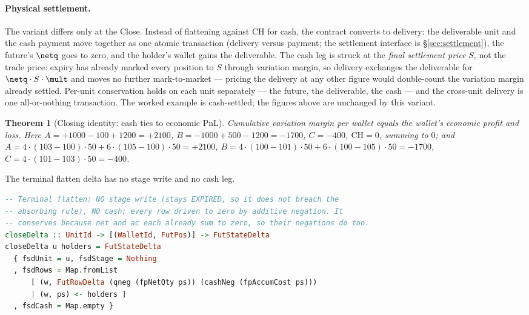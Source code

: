 \documentclass[11pt,a4paper]{article}
\newtheorem{theorem}[definition]{Theorem}
\begin{document}
\paragraph{Physical settlement.} The variant differs only at the Close. Instead of flattening against
CH for cash, the contract converts to delivery: the deliverable unit and the cash payment move
together as one atomic transaction (delivery versus payment; the settlement interface is
\S\ref{sec:settlement}), the future's $\netq$ goes to zero, and the holder's wallet gains the deliverable.
The cash leg is struck at the \emph{final settlement price} $S$, not the trade price: expiry has
already marked every position to $S$ through variation margin, so delivery exchanges the deliverable
for $\netq\cdot S\cdot\mult$ and moves no further mark-to-market --- pricing the delivery at any other
figure would double-count the variation margin already settled. Per-unit conservation holds on each
unit separately --- the future, the deliverable, the cash --- and the cross-unit delivery is one
all-or-nothing transaction. The worked example is cash-settled; the figures above are unchanged by
this variant.

\begin{theorem}[Closing identity: cash ties to economic PnL]
Cumulative variation margin per wallet equals the wallet's economic profit and loss. Here
$A=+1000-100+1200=+2100$, $B=-1000+500-1200=-1700$, $C=-400$, $\text{CH}=0$, summing to $0$; and
$A=4\cdot(103-100)\cdot 50+6\cdot(105-100)\cdot 50=+2100$,
$B=4\cdot(100-101)\cdot 50+6\cdot(100-105)\cdot 50=-1700$, $C=4\cdot(101-103)\cdot 50=-400$.
\end{theorem}

The terminal flatten delta has no stage write and no cash leg.

\begin{lstlisting}[language=Haskell]
-- Terminal flatten: NO stage write (stays EXPIRED, so it does not breach the
-- absorbing rule), NO cash; every row driven to zero by additive negation. It
-- conserves because net and ac each already sum to zero, so their negations do too.
closeDelta :: UnitId -> [(WalletId, FutPos)] -> FutStateDelta
closeDelta u holders = FutStateDelta
  { fsdUnit = u, fsdStage = Nothing
  , fsdRows = Map.fromList
      [ (w, FutRowDelta (qneg (fpNetQty ps)) (cashNeg (fpAccumCost ps)))
      | (w, ps) <- holders ]
  , fsdCash = Map.empty }
\end{lstlisting}

\end{document}
